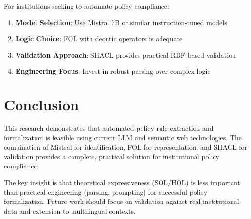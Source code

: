 For institutions seeking to automate policy compliance:

\begin{enumerate}
    \item \textbf{Model Selection}: Use Mistral 7B or similar instruction-tuned models
    \item \textbf{Logic Choice}: FOL with deontic operators is adequate
    \item \textbf{Validation Approach}: SHACL provides practical RDF-based validation
    \item \textbf{Engineering Focus}: Invest in robust parsing over complex logic
\end{enumerate}

\section{Conclusion}

This research demonstrates that automated policy rule extraction and formalization is feasible using current LLM and semantic web technologies. The combination of Mistral for identification, FOL for representation, and SHACL for validation provides a complete, practical solution for institutional policy compliance.

The key insight is that theoretical expressiveness (SOL/HOL) is less important than practical engineering (parsing, prompting) for successful policy formalization. Future work should focus on validation against real institutional data and extension to multilingual contexts.
